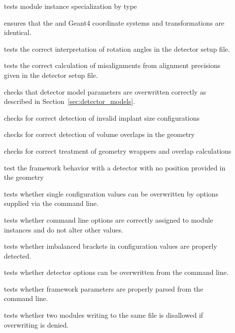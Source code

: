 \begin{description}
    \item[] tests module instance specialization by type
    \item[] ensures that the \apsq and Geant4 coordinate systems and transformations are identical.
    \item[] tests the correct interpretation of rotation angles in the detector setup file.
    \item[] tests the correct calculation of misalignments from alignment precisions given in the detector setup file.
    \item[] checks that detector model parameters are overwritten correctly as described in Section~\ref{sec:detector_models}.
    \item[] checks for correct detection of invalid implant size configurations
    \item[] checks for correct detection of volume overlaps in the geometry
    \item[] checks for correct treatment of geometry wrappers and overlap calculations
    \item[] test the framework behavior with a detector with no position provided in the geometry
    \item[] tests whether single configuration values can be overwritten by options supplied via the command line.
    \item[] tests whether command line options are correctly assigned to module instances and do not alter other values.
    \item[] tests whether imbalanced brackets in configuration values are properly detected.
    \item[] tests whether detector options can be overwritten from the command line.
    \item[] tests whether framework parameters are properly parsed from the command line.
    \item[] tests whether two modules writing to the same file is disallowed if overwriting is denied.

\end{description}
